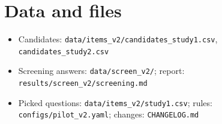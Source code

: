 \documentclass[11pt,a4paper]{article}
\begin{document}
\appendix
\section{Data and files}
\begin{itemize}[leftmargin=*]
  \item Candidates: \texttt{data/items\_v2/candidates\_study1.csv}, \texttt{candidates\_study2.csv}
  \item Screening answers: \texttt{data/screen\_v2/}; report: \texttt{results/screen\_v2/screening.md}
  \item Picked questions: \texttt{data/items\_v2/study1.csv}; rules: \texttt{configs/pilot\_v2.yaml}; changes: \texttt{CHANGELOG.md}
\end{itemize}



\end{document}

